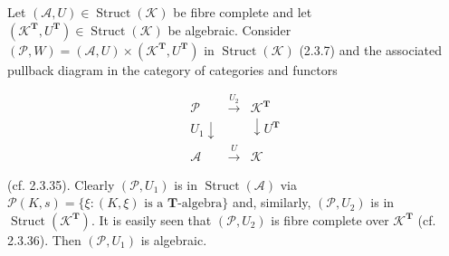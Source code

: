 Let $(\mathcal{A}, U) \in \operatorname{Struct}(\mathcal{K})$ be fibre complete and let $(\mathcal{K}^{\mathbf{T}}, U^{\mathbf{T}}) \in \operatorname{Struct}(\mathcal{K})$ be algebraic. Consider $(\mathcal{P}, W) = (\mathcal{A}, U) \times (\mathcal{K}^{\mathbf{T}}, U^{\mathbf{T}})$ in $\operatorname{Struct}(\mathcal{K})$ (2.3.7) and the associated pullback diagram in the category of categories and functors

$$
\begin{array}{ccc}
\mathcal{P} & \xrightarrow{U_2} & \mathcal{K}^{\mathbf{T}} \\
{\scriptstyle U_1}\downarrow & & \downarrow {\scriptstyle U^{\mathbf{T}}} \\
\mathcal{A} & \xrightarrow{U} & \mathcal{K}
\end{array}
$$

(cf. 2.3.35). Clearly $(\mathcal{P}, U_1)$ is in $\operatorname{Struct}(\mathcal{A})$ via $\mathcal{P}(K, s) = \{\xi : (K, \xi) \text{ is a } \mathbf{T}\text{-algebra}\}$ and, similarly, $(\mathcal{P}, U_2)$ is in $\operatorname{Struct}(\mathcal{K}^{\mathbf{T}})$. It is easily seen that $(\mathcal{P}, U_2)$ is fibre complete over $\mathcal{K}^{\mathbf{T}}$ (cf. 2.3.36). Then $(\mathcal{P}, U_1)$ is algebraic.
